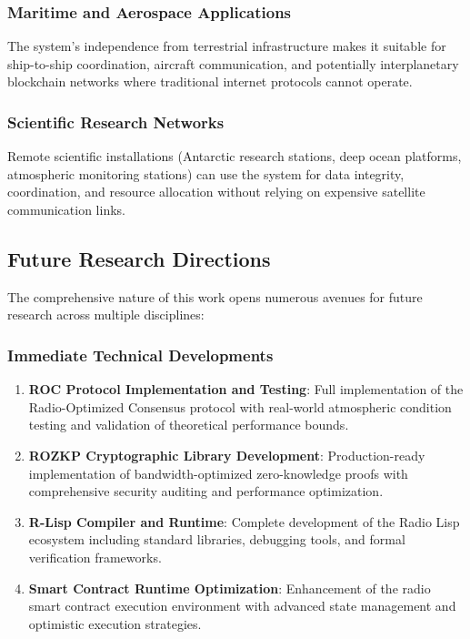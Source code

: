 \documentclass[11pt,a4paper]{article}
\begin{document}
\subsubsection{Maritime and Aerospace Applications}

The system's independence from terrestrial infrastructure makes it suitable for ship-to-ship coordination, aircraft communication, and potentially interplanetary blockchain networks where traditional internet protocols cannot operate.

\subsubsection{Scientific Research Networks}

Remote scientific installations (Antarctic research stations, deep ocean platforms, atmospheric monitoring stations) can use the system for data integrity, coordination, and resource allocation without relying on expensive satellite communication links.

\subsection{Future Research Directions}

The comprehensive nature of this work opens numerous avenues for future research across multiple disciplines:

\subsubsection{Immediate Technical Developments}

\begin{enumerate}
\item \textbf{ROC Protocol Implementation and Testing}: Full implementation of the Radio-Optimized Consensus protocol with real-world atmospheric condition testing and validation of theoretical performance bounds.

\item \textbf{ROZKP Cryptographic Library Development}: Production-ready implementation of bandwidth-optimized zero-knowledge proofs with comprehensive security auditing and performance optimization.

\item \textbf{R-Lisp Compiler and Runtime}: Complete development of the Radio Lisp ecosystem including standard libraries, debugging tools, and formal verification frameworks.

\item \textbf{Smart Contract Runtime Optimization}: Enhancement of the radio smart contract execution environment with advanced state management and optimistic execution strategies.
\end{enumerate}
\end{document}
